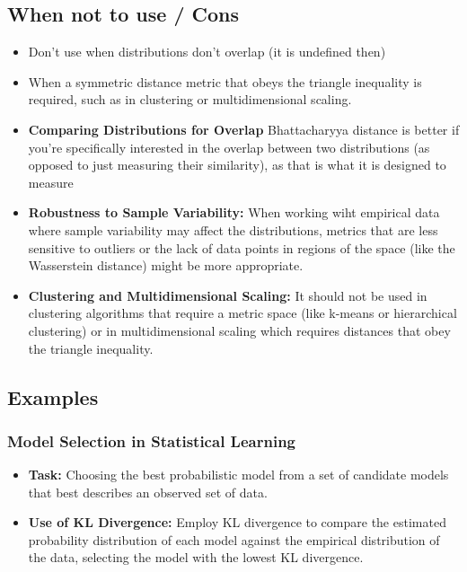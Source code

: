 \documentclass[12pt]{article}
\begin{document}
\subsection{When not to use / Cons}
\begin{itemize}
    \item Don't use when distributions don't overlap (it is undefined then)
    \item When a symmetric distance metric that obeys the triangle inequality is required, such as in clustering or multidimensional scaling.
	\item \textbf{Comparing Distributions for Overlap} Bhattacharyya distance is better if you're specifically interested in the overlap between two distributions (as opposed to just measuring their similarity), as that is what it is designed to measure
	\item \textbf{Robustness to Sample Variability:} When working wiht empirical data where sample variability may affect the distributions, metrics that are less sensitive to outliers or the lack of data points in regions of the space (like the Wasserstein distance) might be more appropriate.
	\item \textbf{Clustering and Multidimensional Scaling:} It should not be used in clustering algorithms that require a metric space (like k-means or hierarchical clustering) or in multidimensional scaling which requires distances that obey the triangle inequality.
\end{itemize}

\subsection{Examples}
\subsubsection{Model Selection in Statistical Learning}
\begin{itemize}
    \item \textbf{Task:} Choosing the best probabilistic model from a set of candidate models that best describes an observed set of data.
    \item \textbf{Use of KL Divergence:} Employ KL divergence to compare the estimated probability distribution of each model against the empirical distribution of the data, selecting the model with the lowest KL divergence.
\end{itemize}
\end{document}
